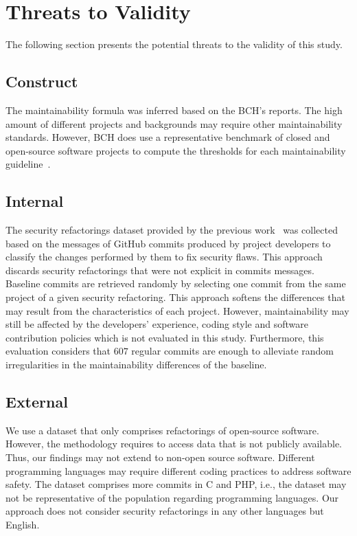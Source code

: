 \documentclass[sigconf,review]{acmart}
\begin{document}
\section{Threats to Validity}\label{sec:threats}
%
The following section presents the potential threats to the validity of this
study.
%
\subsection{Construct}
%
The maintainability formula was inferred based on the BCH's reports. The high
amount of different projects and backgrounds may require other
maintainability standards. However, BCH does use a representative benchmark of
closed and open-source software projects to compute the
thresholds for each maintainability guideline~\cite{Visser:2016:OREILLY, Baggen2012}.

\subsection{Internal}

The security refactorings dataset provided by the previous
work~\cite{Reis:2017:IJSSE} was collected based on the messages of GitHub
commits produced by project developers to classify the changes performed by them
to fix security flaws. This approach discards security refactorings that were
not explicit in commits messages. Baseline commits are retrieved randomly by selecting one commit from the same
project of a given security refactoring. This approach softens the differences
that may result from the characteristics of each project. However,
maintainability may still be affected by the developers' experience, coding
style and software contribution policies which is not evaluated in this study.
Furthermore, this evaluation considers that $607$ regular commits are enough to
alleviate random irregularities in the maintainability differences of the
baseline.

\subsection{External}

We use a dataset that only comprises refactorings of open-source software.
However, the methodology requires to access data that is not publicly available.
Thus, our findings may not extend to non-open source software. Different programming 
languages may require different coding practices to address software safety. The 
dataset comprises more commits in C and PHP, i.e., the dataset may not be representative 
of the population regarding programming languages. Our approach does not consider 
security refactorings in any other languages but English.
\end{document}
